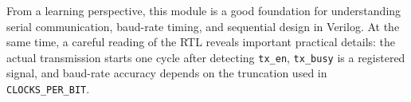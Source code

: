 \documentclass[12pt]{article}
\begin{document}
From a learning perspective, this module is a good foundation for understanding serial communication, baud-rate timing, and sequential design in Verilog. At the same time, a careful reading of the RTL reveals important practical details: the actual transmission starts one cycle after detecting \texttt{tx\_en}, \texttt{tx\_busy} is a registered signal, and baud-rate accuracy depends on the truncation used in \texttt{CLOCKS\_PER\_BIT}.
\end{document}
